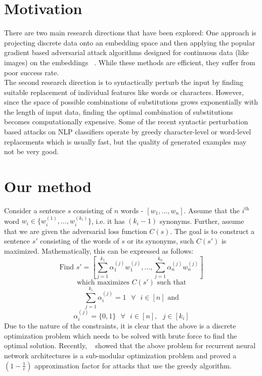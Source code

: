 \documentclass[11pt,a4paper]{article}
\begin{document}
\section{Motivation}
There are two main research directions that have been explored: 
One approach is projecting discrete data onto an embedding space and then applying the popular gradient based adversarial attack algorithms designed for continuous data (like images) on the embeddings ~\cite{miyato2016adversarial, gong2018adversarial}. While these methods are efficient, they suffer from poor success rate.\\
The second research direction is to syntactically perturb the input by finding suitable replacement of individual features like words or characters. However, since the space of possible combinations of substitutions grows exponentially with the length of input data, finding the optimal combination of substitutions %
becomes computationally expensive. 
Some of the recent syntactic perturbation based attacks on NLP classifiers operate by greedy character-level or word-level replacements %
which is usually fast, but the quality of generated examples may not be very good.

\section{Our method}
\label{syntactic_continuous}
Consider a sentence $s$ consisting of $n$ words - $[w_{1},\ldots,w_{n}]$. Assume that the $i^{\text{th}}$ word $w_{i} \in \{w_{i}^{(1)},\ldots,w_{i}^{(k_{i})}\}$, i.e. it has $(k_{i}-1)$ synonyms. Further, assume that we are given the adversarial loss function $C(s)$. The goal is to construct a sentence $s'$ consisting of the words of $s$ or its synonyms, such $C(s')$ is maximized. Mathematically, this can be expressed as follows:
\[\text{Find $s' = [\sum_{j=1}^{k_{1}}\alpha_{1}^{(j)}w_{1}^{(j)},\ldots,\sum_{j=1}^{k_{n}}\alpha_{n}^{(j)}w_{n}^{(j)}]$}\]
\[\text{which maximizes $C(s')$ such that}\]
\[\sum_{j=1}^{k_{i}}\alpha_{i}^{(j)} = 1 \text{ }\forall \text{ }i \in [n] \text{ and}\]
\[\alpha_{i}^{(j)} = \{0,1\} \text{ }\forall \text{ }i \in [n], \text{ }j \in [k_{i}]\]
Due to the nature of the constraints, it is clear that the above is a discrete optimization problem which needs to be solved with brute force to find the optimal solution. %
Recently, ~\cite{lei2018discrete} showed that the above problem for recurrent neural network architectures is a sub-modular optimization problem %
and proved a $(1 - \frac{1}{e})$ approximation factor for attacks that use the greedy algorithm. 
\end{document}
